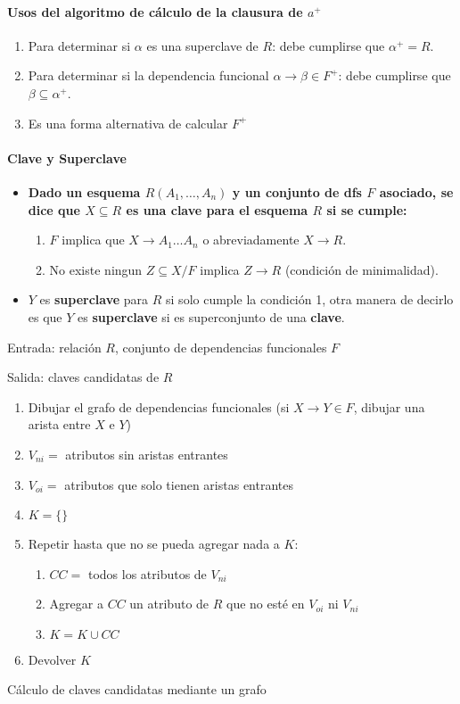 \documentclass[a4paper, twoside]{article}
\begin{document}
\paragraph{Usos del algoritmo de cálculo de la clausura de $a^{+}$}
\begin{enumerate}
	\item Para determinar si $\alpha$ es una superclave de $R$: debe cumplirse que $\alpha^{+}=R$.
	\item Para determinar si la dependencia funcional $\alpha\to\beta\in F^{+}$: debe cumplirse que $\beta\subseteq\alpha^{+}$.
	\item Es una forma alternativa de calcular $F^{+}$
\end{enumerate}

\paragraph{Clave y Superclave}
\begin{itemize}
	\item \textbf{Dado un esquema $R(A_{1},\dots,A_{n})$ y un conjunto de dfs $F$ asociado, se dice que $X \subseteq R$ es una \textbf{clave} para el esquema $R$ si se cumple:}
	\begin{enumerate}
		\item $F$ implica que  $X \to A_{1} \dots A_{n}$ o abreviadamente $X \to R$.
		\item No existe ningun $Z \subseteq X / F $ implica $Z \to R $ (condición de minimalidad).
	\end{enumerate}
	\item $Y$ es \textbf{superclave} para $R$ si solo cumple la condición 1, otra manera de decirlo es 	que $Y$ es \textbf{superclave} si es superconjunto de una \textbf{clave}.
\end{itemize}


\begin{algorithm}[H]
	Entrada: relación $R$, conjunto de dependencias funcionales $F$

	Salida: claves candidatas de $R$
	\begin{enumerate}
		\item Dibujar el grafo de dependencias funcionales (si $X\to Y\in F$, dibujar una arista entre $X$ e $Y$)
		\item $V_{ni}=$ atributos sin aristas entrantes
		\item $V_{oi}=$ atributos que solo tienen aristas entrantes
		\item $K=\{\}$
		\item Repetir hasta que no se pueda agregar nada a $K$:
		\begin{enumerate}
			\item $CC=$ todos los atributos de $V_{ni}$
			\item Agregar a $CC$ un atributo de $R$ que no esté en $V_{oi}$ ni $V_{ni}$
			\item $K=K\cup CC$
		\end{enumerate}
		\item Devolver $K$
	\end{enumerate}
	\caption{Cálculo de claves candidatas mediante un grafo}
\end{algorithm}
\end{document}
